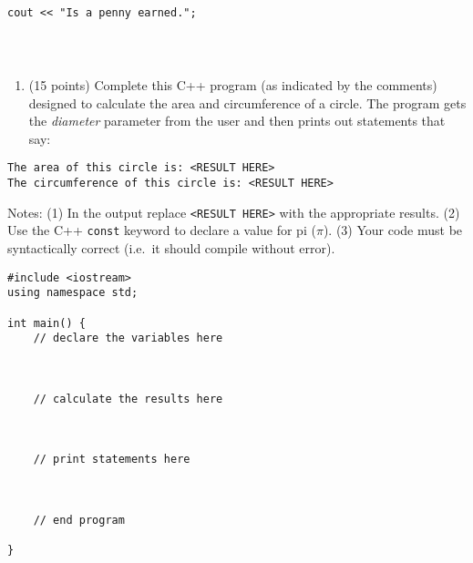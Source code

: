 \begin{verbatim}
cout << "Is a penny earned.";
\end{verbatim}

\begin{verbatim}



\end{verbatim}

\begin{enumerate}
\def\labelenumi{\arabic{enumi}.}
\setcounter{enumi}{11}
\tightlist
\item
  (15 points) Complete this C++ program (as indicated by the comments)
  designed to calculate the area and circumference of a circle. The
  program gets the \emph{diameter} parameter from the user and then
  prints out statements that say:
\end{enumerate}

\begin{verbatim}
The area of this circle is: <RESULT HERE>
The circumference of this circle is: <RESULT HERE>
\end{verbatim}

Notes: (1) In the output replace
\texttt{\textless{}RESULT\ HERE\textgreater{}} with the appropriate
results. (2) Use the C++ \texttt{const} keyword to declare a value for
pi (\(\pi\)). (3) Your code must be syntactically correct (i.e.~it
should compile without error).

\begin{verbatim}
#include <iostream>
using namespace std;

int main() {
    // declare the variables here



    // calculate the results here



    // print statements here



    // end program

}
\end{verbatim}
